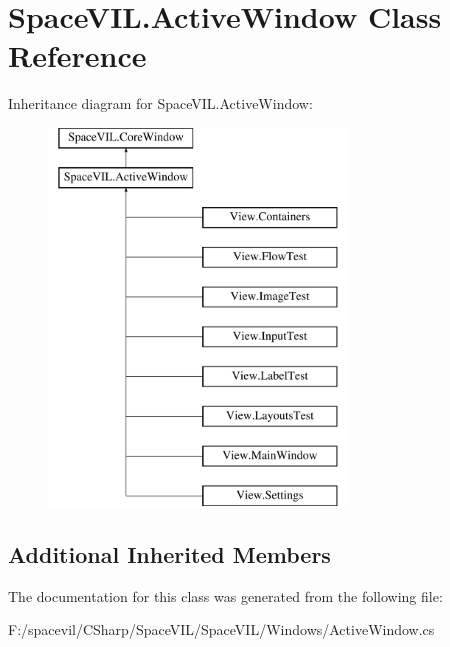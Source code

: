 \hypertarget{class_space_v_i_l_1_1_active_window}{}\section{Space\+V\+I\+L.\+Active\+Window Class Reference}
\label{class_space_v_i_l_1_1_active_window}
Inheritance diagram for Space\+V\+I\+L.\+Active\+Window\+:\begin{figure}[H]
\begin{center}
\leavevmode
\includegraphics[height=10.000000cm]{class_space_v_i_l_1_1_active_window}
\end{center}
\end{figure}
\subsection*{Additional Inherited Members}


The documentation for this class was generated from the following file\+:\begin{DoxyCompactItemize}
\item 
F\+:/spacevil/\+C\+Sharp/\+Space\+V\+I\+L/\+Space\+V\+I\+L/\+Windows/Active\+Window.\+cs\end{DoxyCompactItemize}
